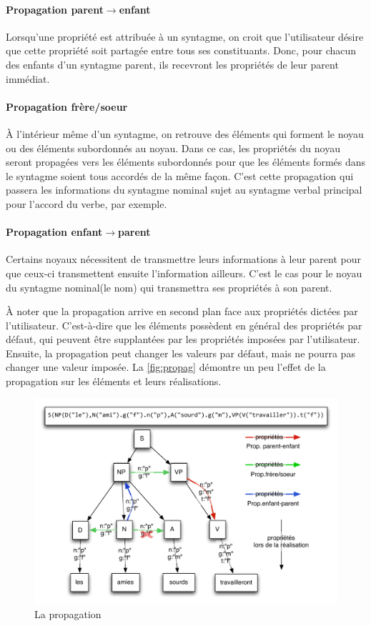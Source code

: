 \documentclass[11pt]{article} %
\begin{document}
\paragraph{Propagation parent$\rightarrow$enfant}

Lorsqu'une propriété est attribuée à un syntagme, on croit que l'utilisateur
désire que cette propriété soit partagée entre tous ses constituants.
Donc, pour chacun des enfants d'un syntagme parent, ils recevront
les propriétés de leur parent immédiat.

\paragraph{Propagation frère/soeur}

À l'intérieur même d'un syntagme, on retrouve des éléments qui forment
le noyau ou des éléments subordonnés au noyau. Dans ce cas, les propriétés
du noyau seront propagées vers les éléments subordonnés pour que les
éléments formés dans le syntagme soient tous accordés de la même façon.
C'est cette propagation qui passera les informations du syntagme nominal
sujet au syntagme verbal principal pour l'accord du verbe, par exemple. 

\paragraph{Propagation enfant$\rightarrow$parent}

Certains noyaux nécessitent de transmettre leurs informations à leur
parent pour que ceux-ci transmettent ensuite l'information ailleurs.
C'est le cas pour le noyau du syntagme nominal(le nom) qui transmettra
ses propriétés à son parent.

À noter que la propagation arrive en second plan face aux propriétés
dictées par l'utilisateur. C'est-à-dire que les éléments possèdent
en général des propriétés par défaut, qui peuvent être supplantées
par les propriétés imposées par l'utilisateur. Ensuite, la propagation
peut changer les valeurs par défaut, mais ne pourra pas changer une
valeur imposée. La \autoref{fig:propag} démontre un peu l'effet de la propagation
sur les éléments et leurs réalisations.
\begin{figure}
\centering
\caption{La propagation}
\label{fig:propag}
\includegraphics[scale=0.8]{Propagation}
\end{figure}
\end{document}
